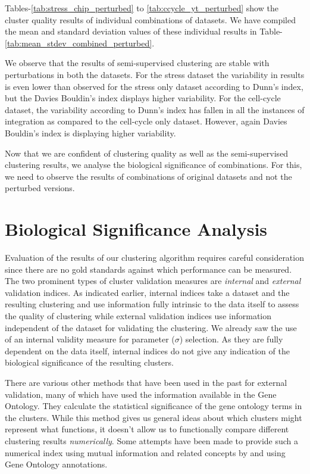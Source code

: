 Tables-\ref{tab:stress_chip_perturbed} to \ref{tab:ccycle_yt_perturbed} show the cluster quality results of individual combinations of datasets. We have compiled the mean 
and standard deviation values of these individual results in Table-\ref{tab:mean_stdev_combined_perturbed}. 

We observe that the results of semi-supervised clustering are stable with perturbations in both the datasets. For the stress dataset the variability in results is even lower than
 observed for the stress only dataset according to Dunn's index, but the Davies Bouldin's index displays higher variability. For the cell-cycle dataset, the variability according to Dunn's
 index has fallen in all the instances of integration as compared to the cell-cycle only dataset. However, again Davies Bouldin's index is displaying higher variability.
  
Now that we are confident of clustering quality as well as the semi-supervised clustering results, 
we analyse the biological significance of combinations. For this, we need to observe the results of combinations of original datasets 
and not the perturbed versions. 

\section{Biological Significance Analysis}
Evaluation of the results of our clustering algorithm requires careful consideration since there are no gold standards against which performance can be measured. 
The two prominent types of cluster validation measures are \textit{internal} and \textit{external} validation indices. As indicated earlier, internal indices take a dataset and 
the resulting clustering and use information fully intrinsic to the data itself to assess the quality of clustering while external validation indices use information independent 
of the dataset for validating the clustering. We already saw the use of an internal validity measure for parameter ($\sigma$) selection. As they are fully dependent on the 
data itself, internal indices do not give any indication of the biological significance of the resulting clusters.  

There are various other methods that have been used in the past for external validation, many of which have used the information available in the Gene Ontology. 
They calculate the statistical significance of the gene ontology terms in the clusters. While this method gives us general ideas about which clusters might represent 
what functions, it doesn't allow us to functionally compare different clustering results \textit{numerically}. Some attempts have been made to provide 
such a numerical index using mutual information and related concepts by \citet{Gibons2002Judging} and \citet{gatviks03scoring} using Gene Ontology annotations. 

